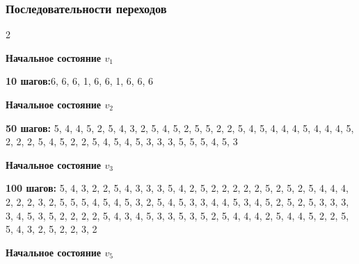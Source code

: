 \documentclass[a4paper, final]{article}
\begin{document}
\subsubsection*{Последовательности переходов}
\begingroup
\fontsize{7}{8}\selectfont
\setlength{\columnsep}{11pt}
\begin{multicols}{2}
	\raggedright
	\noindent\textbf{Начальное состояние $v_1$}\par
	\noindent\textbf{10 шагов:}6, 6, 6, 1, 6, 6, 1, 6, 6, 6\par\smallskip
	\medskip
	\noindent\textbf{Начальное состояние $v_2$}\par
	\noindent\textbf{50 шагов:} 5, 4, 4, 5, 2, 5, 4, 3, 2, 5, 4, 5, 2, 5, 5, 2, 2, 5, 4, 5, 4, 4, 4, 5, 4, 4, 4, 5, 2, 2, 2, 5, 4, 5, 2, 2, 5, 4, 5, 4, 5, 3, 3, 3, 5, 5, 5, 4, 5, 3\par\smallskip
	\medskip
	\noindent\textbf{Начальное состояние $v_3$}\par
	\noindent\textbf{100 шагов:}  5, 4, 3, 2, 2, 5, 4, 3, 3, 3, 5, 4, 2, 5, 2, 2, 2, 2, 2, 5, 2, 5, 2, 5, 4, 4, 4, 2, 2, 2, 3, 2, 5, 5, 5, 4, 5, 4, 5, 3, 2, 5, 4, 5, 3, 3, 4, 4, 5, 3, 4, 5, 2, 5, 2, 5, 3, 3, 3, 3, 4, 5, 3, 5, 2, 2, 2, 2, 5, 4, 3, 4, 5, 3, 3, 5, 3, 5, 2, 5, 4, 4, 4, 2, 5, 4, 4, 5, 2, 2, 5, 5, 4, 3, 2, 5, 2, 2, 3, 2\par\smallskip
	\medskip
	\noindent\textbf{Начальное состояние $v_5$}\par

\end{multicols}
\end{document}
